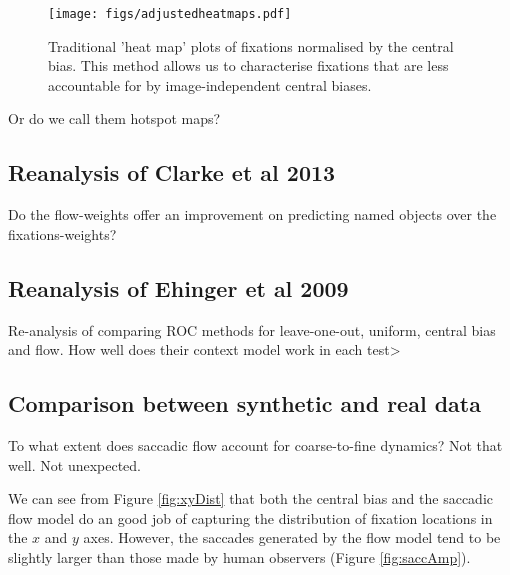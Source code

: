 \begin{figure}
\texttt{[image: figs/adjustedheatmaps.pdf]}
\caption{Traditional 'heat map' plots of fixations normalised by the central bias. This method allows us to characterise fixations that are less accountable for by image-independent central biases.}
\label{fig:adjustedHeatmaps}
\end{figure}

Or do we call them hotspot maps?

\subsection{Reanalysis of Clarke et al 2013}

Do the flow-weights offer an improvement on predicting named objects over the fixations-weights?

\subsection{Reanalysis of Ehinger et al 2009}

Re-analysis of \cite{ehinger2009} comparing ROC methods for leave-one-out, uniform, central bias and flow. How well does their context model work in each test>

\subsection{Comparison between synthetic and real data}

To what extent does saccadic flow account for coarse-to-fine dynamics? Not that well. Not unexpected.

We can see from Figure \ref{fig:xyDist} that both the central bias and the saccadic flow model do an good job of capturing the distribution of fixation locations in the $x$ and $y$ axes. However, the saccades generated by the flow model tend to be slightly larger than those made by human observers (Figure \ref{fig:saccAmp}). 

